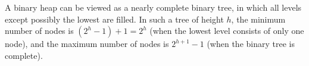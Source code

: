 A binary heap can be viewed as a nearly complete binary tree, in which all levels except possibly the lowest are filled.
In such a tree of height $h$, the minimum number of nodes is $(2^h-1)+1=2^h$ (when the lowest level consists of only one node), and the maximum number of nodes is $2^{h+1}-1$ (when the binary tree is complete).
